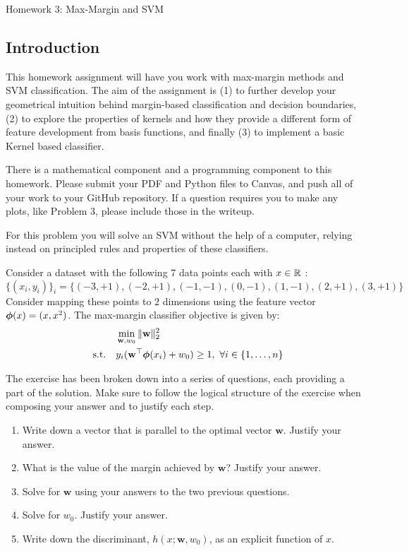 \documentclass[submit]{harvardml}
\begin{document}
\begin{center}
{\Large Homework 3: Max-Margin and SVM}\\
\end{center}
\subsection*{Introduction}

This homework assignment will have you work with max-margin methods
and SVM classification. The aim of the assignment is (1) to further
develop your geometrical intuition behind margin-based classification
and decision boundaries, (2) to explore the properties of kernels and
how they provide a different form of feature development from
basis functions, and finally (3) to implement a basic Kernel based
classifier.

There is a mathematical component and a programming component to this
homework.  Please submit your PDF and Python files to Canvas, and push
all of your work to your GitHub repository. If a question requires you
to make any plots, like Problem 3, please include those in the
writeup.

\newpage
\begin{problem}
  For this problem you will solve an SVM without the help of a
  computer, relying instead on principled rules and properties of
  these classifiers.

Consider a dataset with the following 7 data points each with $x \in \mathbb{R}$ : \[\{(x_i, y_i)\}_i =\{(-3
, +1 ), (-2 , +1 ) , (-1,  -1 ), (0, -1), ( 1 , -1 ), ( 2 , +1 ), ( 3 , +1 )\}\] Consider
mapping these points to $2$ dimensions using the feature vector $\boldsymbol{\phi}(x) =  (x, x^2)$. The max-margin classifier objective is given by:
\begin{align*}
  &\min_{\mathbf{w}, w_0} \|\mathbf{w}\|_2^2 \\
  \quad \text{s.t.} \quad & y_i(\mathbf{w}^\top \boldsymbol{\phi}(x_i) + w_0) \geq 1,~\forall i \in \{1,\ldots, n\}
\end{align*}

The exercise has been broken down into a series of questions, each
providing a part of the solution. Make sure to follow the logical structure of
the exercise when composing your answer and to justify each step.

\begin{enumerate}
  \item Write down a vector that is parallel to the optimal vector $\mathbf{w}$. Justify
    your answer.
  \item What is the value of the margin achieved by $\mathbf{w}$? Justify your
    answer.
  \item Solve for $\mathbf{w}$ using your answers to the two previous questions.
  \item Solve for $w_0$. Justify your answer.
  \item Write down the discriminant, $h(x; \mathbf{w}, w_0)$, as an explicit function of $x$.
\end{enumerate}

\end{problem}
\end{document}
